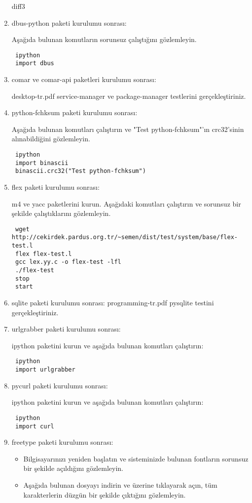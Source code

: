 \documentclass[a4paper,10pt]{article}
\begin{document}
\begin{enumerate}
diff3 
\item dbus-python paketi kurulumu sonrası:

Aşağıda bulunan komutların sorunsuz çalıştığını gözlemleyin.
\begin{verbatim}
 ipython
 import dbus
\end{verbatim}


\item comar ve comar-api paketleri kurulumu sonrası:

desktop-tr.pdf service-manager ve package-manager testlerini gerçekleştiriniz.
\item python-fchksum paketi kurulumu sonrası:

Aşağıda bulunan komutları çalıştırın ve "Test python-fchksum"'ın crc32'sinin alınabildiğini gözlemleyin.
\begin{verbatim}
 ipython
 import binascii
 binascii.crc32("Test python-fchksum")
\end{verbatim}

\item flex paketi kurulumu sonrası:

m4 ve yacc paketlerini kurun.
Aşağıdaki komutları çalıştırın ve sorunsuz bir şekilde çalıştıklarını gözlemleyin.
\begin{verbatim}
 wget http://cekirdek.pardus.org.tr/~semen/dist/test/system/base/flex-test.l
 flex flex-test.l
 gcc lex.yy.c -o flex-test -lfl 
 ./flex-test
 stop
 start
\end{verbatim}


\item sqlite paketi kurulumu sonrası:
programming-tr.pdf pysqlite testini gerçekleştiriniz.

\item urlgrabber paketi kurulumu sonrası:

ipython paketini kurun ve aşağıda bulunan komutları çalıştırın:
\begin{verbatim}
 ipython
 import urlgrabber
\end{verbatim}

\item pycurl paketi kurulumu sonrası:

ipython paketini kurun ve aşağıda bulunan komutları çalıştırın:
\begin{verbatim}
 ipython
 import curl
\end{verbatim}

\item freetype paketi kurulumu sonrası: 

\begin{itemize}
 \item Bilgisayarınızı yeniden başlatın ve sisteminizde bulunan fontların sorunsuz bir şekilde açıldığını gözlemleyin.
 \item Aşağıda bulunan dosyayı indirin ve üzerine tıklayarak açın, tüm karakterlerin düzgün bir şekilde çıktığını gözlemleyin.


\end{itemize}
\end{enumerate}
\end{document}
